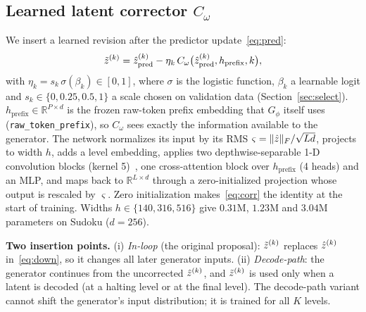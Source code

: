 \subsection{Learned latent corrector $C_\omega$}
We insert a learned revision after the predictor update~\eqref{eq:pred}:
\begin{equation}
\tilde{z}^{(k)}=\hat{z}^{(k)}_{\mathrm{pred}}-\eta_k\,C_\omega\big(\hat{z}^{(k)}_{\mathrm{pred}},h_{\mathrm{prefix}},k\big), \label{eq:corr}
\end{equation}
with $\eta_k=s_k\,\sigma(\beta_k)\in[0,1]$, where $\sigma$ is the logistic function, $\beta_k$ a learnable logit and $s_k\in\{0,0.25,0.5,1\}$ a scale chosen on validation data (Section~\ref{sec:select}). $h_{\mathrm{prefix}}\in\mathbb{R}^{P\times d}$ is the frozen raw-token prefix embedding that $G_\phi$ itself uses (\texttt{raw\_token\_prefix}), so $C_\omega$ sees exactly the information available to the generator. The network normalizes its input by its RMS $\varsigma=\|\hat{z}\|_F/\sqrt{Ld}$, projects to width $h$, adds a level embedding, applies two depthwise-separable 1-D convolution blocks (kernel 5)~\citep{chollet2017xception}, one cross-attention block over $h_{\mathrm{prefix}}$ (4 heads) and an MLP, and maps back to $\mathbb{R}^{L\times d}$ through a zero-initialized projection whose output is rescaled by $\varsigma$. Zero initialization makes~\eqref{eq:corr} the identity at the start of training. Widths $h\in\{140,316,516\}$ give $0.31$M, $1.23$M and $3.04$M parameters on Sudoku ($d=256$).

\textbf{Two insertion points.} (i) \emph{In-loop} (the original proposal): $\tilde{z}^{(k)}$ replaces $\hat{z}^{(k)}$ in~\eqref{eq:down}, so it changes all later generator inputs. (ii) \emph{Decode-path}: the generator continues from the uncorrected $\hat{z}^{(k)}$, and $\tilde{z}^{(k)}$ is used only when a latent is decoded (at a halting level or at the final level). The decode-path variant cannot shift the generator's input distribution; it is trained for all $K$ levels.


